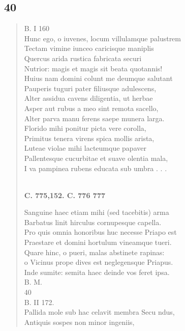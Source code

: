 \documentclass[11pt, a4paper]{report}
\begin{document}
            \subsection*{40}
      \begin{verse}
      B. I 160 \\ Hunc ego,  \lbrack o \rbrack  iuvenes, locum villulamque palustrem \\ Tectam vimine iunceo caricisque maniplis \\ Quercus arida rustica fabricata securi \\ Nutrior: magis et magis sit beata quotannis! \\ Huius nam domini colunt me deumque salutant \\ Pauperis tuguri pater filiusque adulescens, \\ Alter assidua cavens diligentia, ut herbae \\ Asper aut rubus a meo sint remota sacello, \\ Alter parva manu ferens saepe munera larga. \\ Florido mihi ponitur picta vere corolla, \\ Primitus tenera virens spica mollis arista, \\ Luteae violae mihi lacteumque papaver \\ Pallentesque cucurbitae et suave olentia mala, \\ I va pampinea rubens educata sub umbra . . . \\ 
        ﻿\pagebreak 
    \begin{center} \textbf{C. 775,152. C. 776 777} \end{center} \marginpar{[261]} Sanguine  \lbrack haec \rbrack  etiam mihi (sed tacebitis) arma \\ Barbatus linit hirculus cornupesque capella. \\ Pro quis omnia honoribus huc necesse Priapo est \\ Praestare et domini hortulum vineamque tueri. \\ Quare hinc, o pueri, malas abstinete rapinas: \\ o Vicinus prope dives est neglegensque Priapus. \\ Inde sumite: semita haec deinde vos feret ipsa. \\ B. M. \\ 40 \\ B. II 172. \\ Pallida mole sub hac celavit membra Secu \lbrack ndus, \\ Antiquis sospes non minor ingeniis, \\ 
      \end{verse}
  
\end{document}
